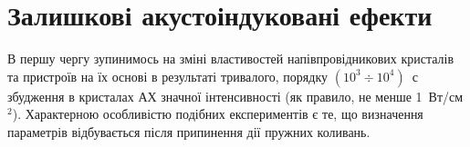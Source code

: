 
\section{Залишкові акустоіндуковані ефекти}

В першу чергу зупинимось на зміні властивостей напівпровідникових кристалів та пристроїв на їх основі в результаті тривалого, порядку $(10^3\div10^4)$~с збудження в кристалах АХ значної інтенсивності (як правило, не менше 1~Вт/см$^2$).
Характерною особливістю подібних експериментів є те, що визначення параметрів відбувається після припинення дії пружних коливань.

